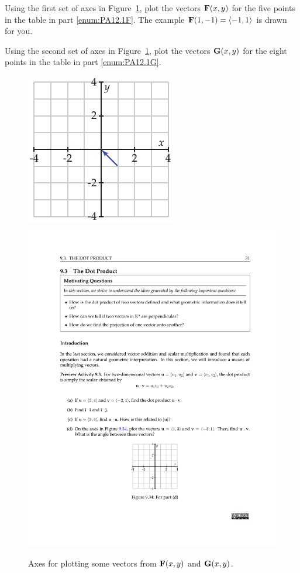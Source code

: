 \begin{pa}
\ba
\restoreCount
\item Using the first set of axes in Figure~\ref{fig:PA12.1a}, plot the vectors $\mathbf{F}(x,y)$ for the five points in the table in part \ref{enum:PA12.1F}. The example $\mathbf{F}(1,-1) = \langle -1,1\rangle$ is drawn for you.
\item Using the second set of axes in Figure~\ref{fig:PA12.1a}, plot the vectors $\mathbf{G}(x,y)$ for the eight points in the table in part \ref{enum:PA12.1G}. 
  \begin{figure}[h]
    \centering
    \includegraphics{figures/PA12-1F-axes.pdf}\hspace{0.5in}    \includegraphics{figures/PA12-1G-axes.pdf}
    \caption{Axes for plotting some vectors from $\mathbf{F}(x,y)$ and $\mathbf{G}(x,y)$.}
    \label{fig:PA12.1a}
  \end{figure}
\ea
\end{pa} 
\afterpa 
